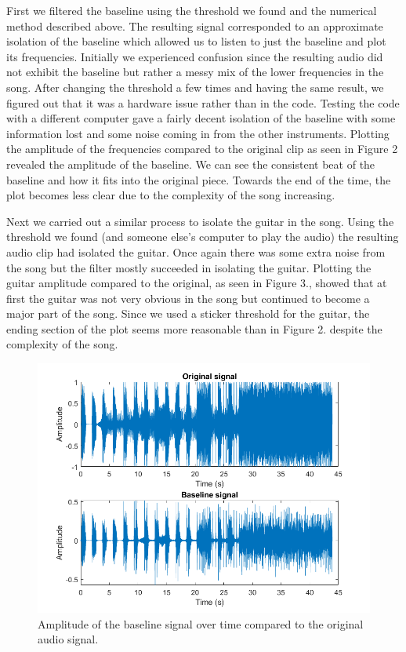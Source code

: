 \documentclass[12pt]{article}%
\begin{document}
First we filtered the baseline using the threshold we found and the numerical method described above. The resulting signal corresponded to an approximate isolation of the baseline which allowed us to listen to just the baseline and plot its frequencies. Initially we experienced confusion since the resulting audio did not exhibit the baseline but rather a messy mix of the lower frequencies in the song. After changing the threshold a few times and having the same result, we figured out that it was a hardware issue rather than in the code. Testing the code with a different computer gave a fairly decent isolation of the baseline with some information lost and some noise coming in from the other instruments. Plotting the amplitude of the frequencies compared to the original clip as seen in Figure 2 revealed the amplitude of the baseline. We can see the consistent beat of the baseline and how it fits into the original piece. Towards the end of the time, the plot becomes less clear due to the complexity of the song increasing. 

Next we carried out a similar process to isolate the guitar in the song. Using the threshold we found (and someone else's computer to play the audio) the resulting audio clip had isolated the guitar. Once again there was some extra noise from the song but the filter mostly succeeded in isolating the guitar. Plotting the guitar amplitude compared to the original, as seen in Figure 3., showed that at first the guitar was not very obvious in the song but continued to become a major part of the song. Since we used a sticker threshold for the guitar, the ending section of the plot seems more reasonable than in Figure 2. despite the complexity of the song.  

\begin{figure}
    \center
    \includegraphics[width = 0.6\linewidth]{baseline.png}
    \caption{Amplitude of the baseline signal over time compared to the original audio signal.}
\end{figure}
    
\end{document}

